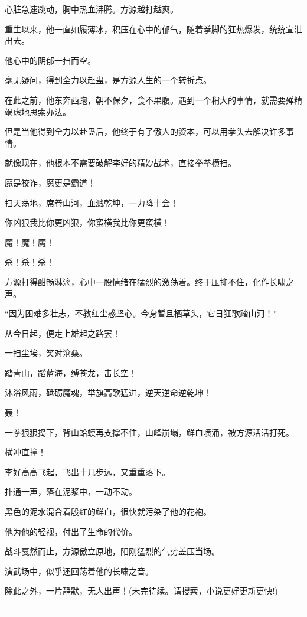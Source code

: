 \begin{this_body}
心脏急速跳动，胸中热血沸腾。方源越打越爽。

重生以来，他一直如履薄冰，积压在心中的郁气，随着拳脚的狂热爆发，统统宣泄出去。

他心中的阴郁一扫而空。

毫无疑问，得到全力以赴蛊，是方源人生的一个转折点。

在此之前，他东奔西跑，朝不保夕，食不果腹。遇到一个稍大的事情，就需要殚精竭虑地思索办法。

但是当他得到全力以赴蛊后，他终于有了傲人的资本，可以用拳头去解决许多事情。

就像现在，他根本不需要破解李好的精妙战术，直接举拳横扫。

魔是狡诈，魔更是霸道！

扫天荡地，席卷山河，血溅乾坤，一力降十会！

你凶狠我比你更凶狠，你蛮横我比你更蛮横！

魔！魔！魔！

杀！杀！杀！

方源打得酣畅淋漓，心中一股情绪在猛烈的激荡着。终于压抑不住，化作长啸之声。

“因为困难多壮志，不教红尘惑坚心。今身暂且栖草头，它日狂歌踏山河！”

从今日起，便走上雄起之路罢！

一扫尘埃，笑对沧桑。

踏青山，蹈蓝海，缚苍龙，击长空！

沐浴风雨，砥砺魔魂，举旗高歌猛进，逆天逆命逆乾坤！

轰！

一拳狠狠捣下，背山蛤蟆再支撑不住，山峰崩塌，鲜血喷涌，被方源活活打死。

横冲直撞！

李好高高飞起，飞出十几步远，又重重落下。

扑通一声，落在泥浆中，一动不动。

黑色的泥水混合着殷红的鲜血，很快就污染了他的花袍。

他为他的轻视，付出了生命的代价。

战斗戛然而止，方源傲立原地，阳刚猛烈的气势盖压当场。

演武场中，似乎还回荡着他的长啸之音。

除此之外，一片静默，无人出声！(未完待续。请搜索，小说更好更新更快!)

------------

\end{this_body}

